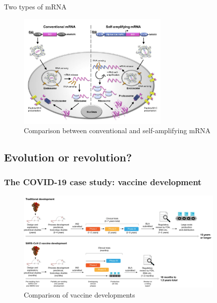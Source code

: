 \begin{frame}{Two types of mRNA}
\begin{figure}
    \centering
    \includegraphics[width=0.65\textwidth]{imgs/mRNA_action.JPG}
    \caption{Comparison between conventional and self-amplifying mRNA \autocite{MRNATransformativeTechnology}}
    \label{fig:mRNAtypes}
\end{figure}
\end{frame}


\subsection{Evolution or revolution?}


\begin{frame}
    \frametitle{The COVID-19 case study: vaccine development}
    \begin{figure}
        \centering
        \includegraphics[width=0.9\textwidth]{imgs/CovidDev.png}
        \caption{Comparison of vaccine developments \autocite{krammerSARSCoV2VaccinesDevelopment2020}}
        \label{fig:responses5}
    \end{figure}
\end{frame}

